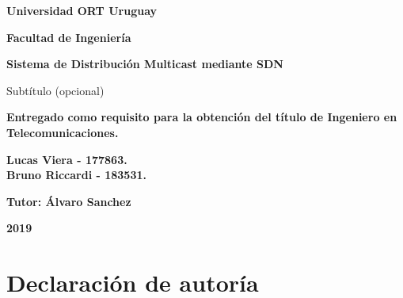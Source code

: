 \documentclass[12pt,a4paper,oneside]{book}
\begin{document}
\vspace*{\fill}

\begin{center}

\begin{Large}
\textbf{Universidad ORT Uruguay}

\textbf{Facultad de Ingeniería}
\vspace{5cm}
\end{Large}

\begin{huge}
\textbf{Sistema de Distribución Multicast mediante SDN}
\end{huge} 

\begin{Large}
Subtítulo (opcional)
\end{Large}
\bigskip
\bigskip


\textbf{Entregado como requisito para la obtención del título de Ingeniero en Telecomunicaciones.}
\vspace{5cm}

\begin{Large}
\textbf{Lucas Viera - 177863.}\\
\textbf{Bruno Riccardi - 183531.}\\
\bigskip

\textbf{Tutor: Álvaro Sanchez}
\vspace{2cm}
\end{Large}

\begin{huge}
\textbf{2019}
\end{huge}

\end{center}
\vspace*{\fill}

\thispagestyle{empty}
\newpage




\chapter*{Declaración de autoría}
\end{document}
